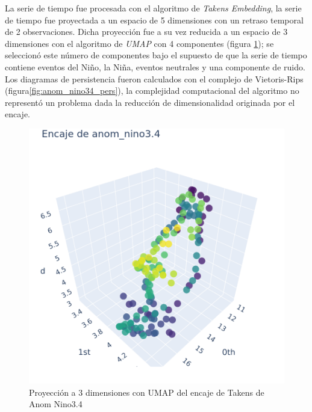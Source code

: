 \documentclass{article}
\begin{document}
            La serie de tiempo fue procesada con el algoritmo de \textit{Takens Embedding}, la serie de tiempo fue proyectada a un espacio de 5 dimensiones con un retraso temporal de 2 observaciones. Dicha proyección fue a su vez reducida a un espacio de 3 dimensiones con el algoritmo de \textit{UMAP} con 4 componentes (figura \ref{fig:anom_nino34_proj}); se seleccionó este número de componentes bajo el supuesto de que la serie de tiempo contiene eventos del Niño, la Niña, eventos neutrales y una componente de ruido. Los diagramas de persistencia fueron calculados con el complejo de Vietoris-Rips (figura\ref{fig:anom_nino34_pers}), la complejidad computacional del algoritmo no representó un problema dada la reducción de dimensionalidad originada por el encaje.
            \begin{figure}[!htbp]
                \centering
                \begin{minipage}{0.45\textwidth}
                    \centering
                    \includegraphics[scale=0.2]{anom_nino3.4_projection.png}
                    \caption{Proyección a 3 dimensiones con UMAP del encaje de Takens de Anom Nino3.4}
                    \label{fig:anom_nino34_proj}
                \end{minipage}
                \begin{minipage}{0.45\textwidth}
                    \centering

\end{minipage}
\end{figure}
\end{document}
